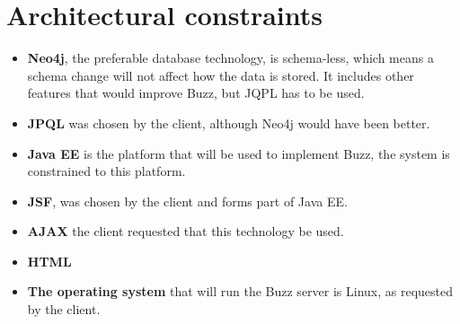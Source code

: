 \documentclass{article}
\begin{document}
\section{Architectural constraints}
\begin{itemize}
\item\textbf{Neo4j}, the preferable database technology, is schema-less, which means a schema change will not affect how the data is stored. It includes other features that would improve Buzz, but JQPL has to be used. \\ 
\item\textbf{JPQL} was chosen by the client, although Neo4j would have been better. \\ 
\item\textbf{Java EE} is the platform that will be used to implement Buzz, the system is constrained to this platform. \\ 
\item\textbf{JSF}, was chosen by the client and forms part of Java EE. \\ 
\item\textbf{AJAX} the client requested that this technology be used.  \\ 
\item\textbf{HTML} \\
\item\textbf{The operating system} that will run the Buzz server is Linux, as requested by the client.
\end{itemize}
\end{document}
